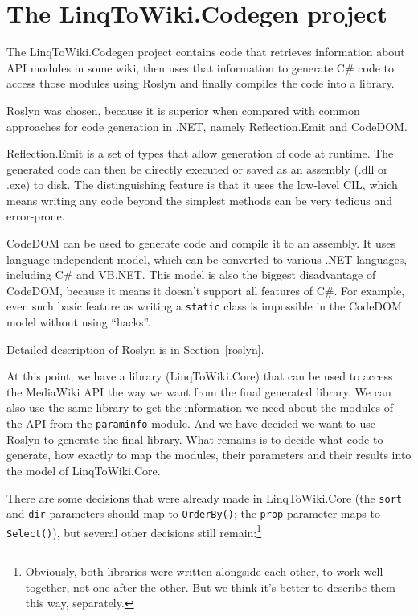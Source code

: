 \section{The LinqToWiki.Codegen project}
\label{ltwc}

The LinqToWiki.Codegen project contains code that retrieves information about \ac{API} modules in some wiki,
then uses that information to generate C\# code to access those modules using Roslyn
and finally compiles the code into a library.

\medskip

Roslyn was chosen, because it is superior when compared with common approaches for code generation in .NET,
namely Reflection.Emit and \acs{CodeDOM}.

Reflection.Emit \cite{reflection-emit} is a set of types that allow generation of code at runtime.
The generated code can then be directly executed or saved as an assembly (.dll or .exe) to disk.
The distinguishing feature is that it uses the low-level \ac{CIL},
which means writing any code beyond the simplest methods can be very tedious and error-prone.

\acs{CodeDOM} \cite{codedom} can be used to generate code and compile it to an assembly.
It uses language-independent model, which can be converted to various .NET languages,
including C\# and \ac{VB.NET}.
This model is also the biggest disadvantage of \acs{CodeDOM}, because it means it doesn't support all features of C\#.
For example, even such basic feature as writing a \lstinline{static} class is impossible in the \acs{CodeDOM} model
without using “hacks”.

Detailed description of Roslyn is in Section~\ref{roslyn}.

\medskip

At this point, we have a library (LinqToWiki.Core) that can be used to access the MediaWiki \ac{API} the way we want
from the final generated library.
We can also use the same library to get the information we need about the modules of the \ac{API} from the \texttt{paraminfo} module.
And we have decided we want to use Roslyn to generate the final library.
What remains is to decide what code to generate, how exactly to map the modules, their parameters
and their results into the model of LinqToWiki.Core.


There are some decisions that were already made in LinqToWiki.Core
(the \texttt{sort} and \texttt{dir} parameters should map to \lstinline{OrderBy()};
the \texttt{prop} parameter maps to \lstinline{Select()}),
but several other decisions still remain:\footnote{
Obviously, both libraries were written alongside each other, to work well together, not one after the other.
But we think it's better to describe them this way, separately.}

